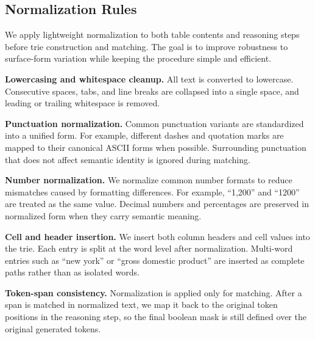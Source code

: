 \documentclass[11pt]{article}
\begin{document}
\subsection{Normalization Rules}
\vspace{-2pt}
We apply lightweight normalization to both table contents and reasoning steps before trie construction and matching. The goal is to improve robustness to surface-form variation while keeping the procedure simple and efficient.


\textbf{Lowercasing and whitespace cleanup.}
All text is converted to lowercase. Consecutive spaces, tabs, and line breaks are collapsed into a single space, and leading or trailing whitespace is removed.


\textbf{Punctuation normalization.}
Common punctuation variants are standardized into a unified form. For example, different dashes and quotation marks are mapped to their canonical ASCII forms when possible. Surrounding punctuation that does not affect semantic identity is ignored during matching.


\textbf{Number normalization.}
We normalize common number formats to reduce mismatches caused by formatting differences. For example, ``1,200'' and ``1200'' are treated as the same value. Decimal numbers and percentages are preserved in normalized form when they carry semantic meaning.


\textbf{Cell and header insertion.}
We insert both column headers and cell values into the trie. Each entry is split at the word level after normalization. Multi-word entries such as ``new york'' or ``gross domestic product'' are inserted as complete paths rather than as isolated words.


\textbf{Token-span consistency.}
Normalization is applied only for matching. After a span is matched in normalized text, we map it back to the original token positions in the reasoning step, so the final boolean mask is still defined over the original generated tokens.
\end{document}
